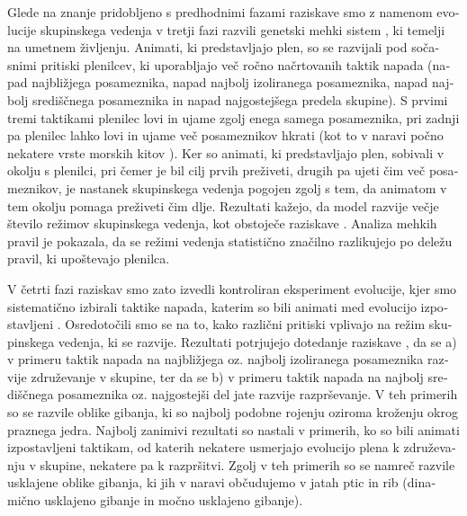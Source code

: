 \begin{slovenian}
Glede na znanje pridobljeno s predhodnimi fazami raziskave smo z namenom evolucije skupinskega vedenja v tretji fazi razvili genetski mehki sistem \cite{demsar2017evolution}, ki temelji na umetnem življenju. Animati, ki predstavljajo plen, so se razvijali pod sočasnimi pritiski plenilcev, ki uporabljajo več ročno načrtovanih taktik napada (napad najbližjega posameznika, napad najbolj izoliranega posameznika, napad najbolj središčnega posameznika in napad najgostejšega predela skupine). S prvimi tremi taktikami plenilec lovi in ujame zgolj enega samega posameznika, pri zadnji pa plenilec lahko lovi in ujame več posameznikov hkrati (kot to v naravi počno nekatere vrste morskih kitov \cite{domenici2001scaling,goldbogen2011mechanics,nottestad1999herring,nottestad2002whales}). Ker so animati, ki predstavljajo plen, sobivali v okolju s plenilci, pri čemer je bil cilj prvih preživeti, drugih pa ujeti čim več posameznikov, je nastanek skupinskega vedenja pogojen zgolj s tem, da animatom v tem okolju pomaga preživeti čim dlje. Rezultati kažejo, da model razvije večje število režimov skupinskega vedenja, kot obstoječe raziskave \cite{biswas2014causes,hein2015evolution,olson2013predator,olson2015exploring,olson2016evolution,reynolds1993evolved,sayers2009evolved,spector2003emergence,wood2007evolving}. Analiza mehkih pravil je pokazala, da se režimi vedenja statistično značilno razlikujejo po deležu pravil, ki upoštevajo plenilca.

V četrti fazi raziskav smo zato izvedli kontroliran eksperiment evolucije, kjer smo sistematično izbirali taktike napada, katerim so bili animati med evolucijo izpostavljeni \cite{demsar2016balanced}. Osredotočili smo se na to, kako različni pritiski vplivajo na režim skupinskega vedenja, ki se razvije. Rezultati potrjujejo dotedanje raziskave \cite{biswas2014causes,olson2013predator,olson2016evolution,wood2007evolving}, da se a) v primeru taktik napada na najbližjega oz. najbolj izoliranega posameznika razvije združevanje v skupine, ter da se b) v primeru taktik napada na najbolj središčnega posameznika oz. najgostejši del jate razvije razprševanje. V teh primerih so se razvile oblike gibanja, ki so najbolj podobne rojenju oziroma kroženju okrog praznega jedra. Najbolj zanimivi rezultati so nastali v primerih, ko so bili animati izpostavljeni taktikam, od katerih nekatere usmerjajo evolucijo plena k združevanju v skupine, nekatere pa k razpršitvi. Zgolj v teh primerih so se namreč razvile usklajene oblike gibanja, ki jih v naravi občudujemo v jatah ptic in rib (dinamično usklajeno gibanje in močno usklajeno gibanje).


\end{slovenian}
